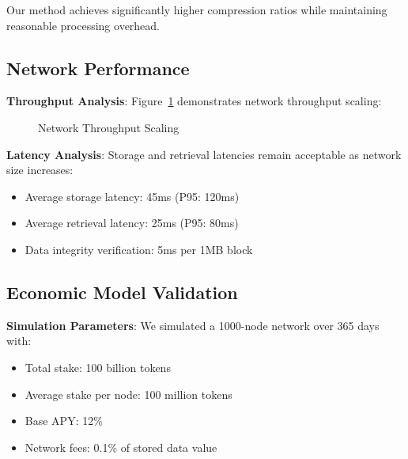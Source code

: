 \documentclass[11pt,a4paper]{article}
\begin{document}
Our method achieves significantly higher compression ratios while maintaining reasonable processing overhead.

\subsection{Network Performance}

\textbf{Throughput Analysis}: Figure~\ref{fig:throughput} demonstrates network throughput scaling:

\begin{figure}[H]
\centering
{}
\caption{Network Throughput Scaling}
\label{fig:throughput}
\end{figure}

\textbf{Latency Analysis}: Storage and retrieval latencies remain acceptable as network size increases:

\begin{itemize}
\item Average storage latency: 45ms (P95: 120ms)
\item Average retrieval latency: 25ms (P95: 80ms)
\item Data integrity verification: 5ms per 1MB block
\end{itemize}

\subsection{Economic Model Validation}

\textbf{Simulation Parameters}: We simulated a 1000-node network over 365 days with:
\begin{itemize}
\item Total stake: 100 billion tokens
\item Average stake per node: 100 million tokens
\item Base APY: 12\%
\item Network fees: 0.1\% of stored data value
\end{itemize}
\end{document}
